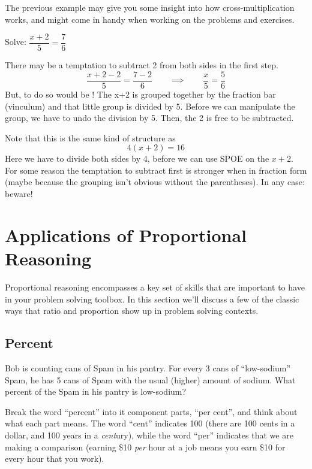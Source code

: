 The previous example may give you some insight into how cross-multiplication works, and might come in handy when working on the problems and exercises.

\begin{boxedwarning}
Solve: $\dfrac{x+2}{5} = \dfrac{7}{6}$

There may be a temptation to subtract 2 from both sides in the first step. \[\dfrac{x+2-2}{5} = \frac{7-2}{6} \qquad\implies\qquad \dfrac{x}{5} = \frac{5}{6}\]
But, to do so would be \evilandwrong! The x+2 is grouped together by the fraction bar (vinculum) and that little group is divided by 5. Before we can manipulate the group, we have to undo the division by 5. Then, the 2 is free to be subtracted.

Note that this is the same kind of structure as \[ 4(x+2) = 16\] Here we have to divide both sides by 4, before we can use SPOE on the $x+2$. For some reason the temptation to subtract first is stronger when in fraction form (maybe because the grouping isn't obvious without the parentheses). In any case: beware!
\end{boxedwarning}

\section{Applications of Proportional Reasoning}
\label{sec:probsolvwithprops}

Proportional reasoning encompasses a key set of skills that are important to have in your problem solving toolbox. In this section we'll discuss a few of the classic ways that ratio and proportion show up in problem solving contexts.

\subsection{Percent}

\begin{boxedexplore}
Bob is counting cans of Spam in his pantry. For every 3 cans of ``low-sodium'' Spam, he has 5 cans of Spam with the usual (higher) amount of sodium. What percent of the Spam in his pantry is low-sodium? 
\end{boxedexplore}

Break the word ``percent'' into it component parts, ``per cent'', and think about what each part means. The word ``cent'' indicates 100 (there are 100 {\em} cents in a dollar, and 100 years in a \textit{cent}ury), while the word ``per'' indicates that we are making a comparison (earning \$10 \textit{per} hour at a job means you earn \$10 for every hour that you work).

